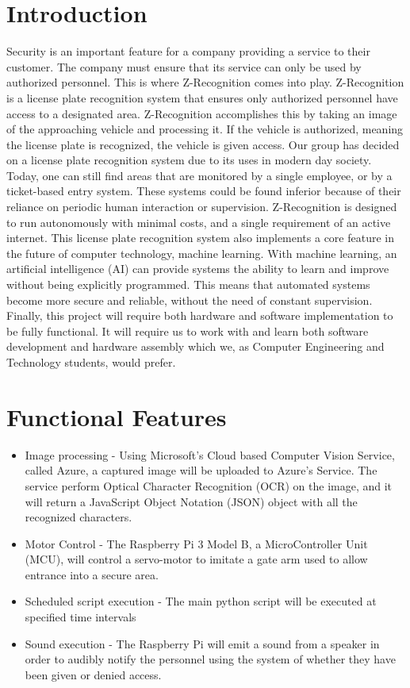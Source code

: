 \documentclass[a4paper,12pt]{article}
\begin{document}
\section{Introduction}
Security is an important feature for a company providing a service to their customer. The company must ensure that its service can only be used by authorized personnel. This is where Z-Recognition comes into play. Z-Recognition is a license plate recognition system that ensures only authorized personnel have access to a designated area. Z-Recognition accomplishes this by taking an image of the approaching vehicle and processing it. If the vehicle is authorized, meaning the license plate is recognized, the vehicle is given access. Our group has decided on a license plate recognition system due to its uses in modern day society. Today, one can still find areas that are monitored by a single employee, or by a ticket-based entry system. These systems could be found inferior because of their reliance on periodic human interaction or supervision. Z-Recognition is designed to run autonomously with minimal costs, and a single requirement of an active internet. This license plate recognition system also implements a core feature in the future of computer technology, machine learning. With machine learning, an artificial intelligence (AI) can provide systems the ability to learn and improve without being explicitly programmed. This means that automated systems become more secure and reliable, without the need of constant supervision. Finally, this project will require both hardware and software implementation to be fully functional. It will require us to work with and learn both software development and hardware assembly which we, as Computer Engineering and Technology students, would prefer.

\newpage
\section{Functional Features}
\begin{itemize}
    \item Image processing - Using Microsoft's Cloud based Computer Vision Service, called Azure, a captured image will be uploaded to Azure's Service. The service perform Optical Character Recognition (OCR) on the image, and it will return a JavaScript Object Notation (JSON) object with all the recognized characters.
    \item Motor Control - The Raspberry Pi 3 Model B, a MicroController Unit (MCU), will control a servo-motor to imitate a gate arm used to allow entrance into a secure area.
    \item Scheduled script execution - The main python script will be executed at specified time intervals
    \item Sound execution - The Raspberry Pi will emit a sound from a speaker in order to audibly notify the personnel using the system of whether they have been given or denied access.
\end{itemize}
\end{document}
